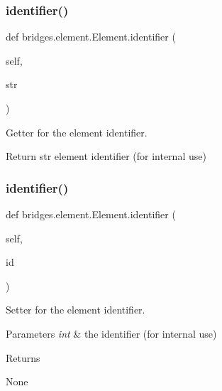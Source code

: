 \subsubsection{\texorpdfstring{identifier()}{identifier()}\hspace{0.1cm}{\footnotesize\ttfamily [1/2]}}
{\footnotesize\ttfamily def bridges.\+element.\+Element.\+identifier (\begin{DoxyParamCaption}\item[{}]{self,  }\item[{}]{str }\end{DoxyParamCaption})}



Getter for the element identifier. 

\begin{DoxyParagraph}{Return}
str element identifier (for internal use) 
\end{DoxyParagraph}
\mbox{\label{classbridges_1_1element_1_1_element_a70ac403466ed78146974a22cebfa0c19}} 
\subsubsection{\texorpdfstring{identifier()}{identifier()}\hspace{0.1cm}{\footnotesize\ttfamily [2/2]}}
{\footnotesize\ttfamily def bridges.\+element.\+Element.\+identifier (\begin{DoxyParamCaption}\item[{}]{self,  }\item[{}]{id }\end{DoxyParamCaption})}



Setter for the element identifier. 


\begin{DoxyParams}{Parameters}
{\em int} & the identifier (for internal use) \\
\hline
\end{DoxyParams}
\begin{DoxyReturn}{Returns}


None 
\end{DoxyReturn}
\mbox{\label{classbridges_1_1element_1_1_element_a3cd2f535bb7993254b8d255cb0166062}} 
